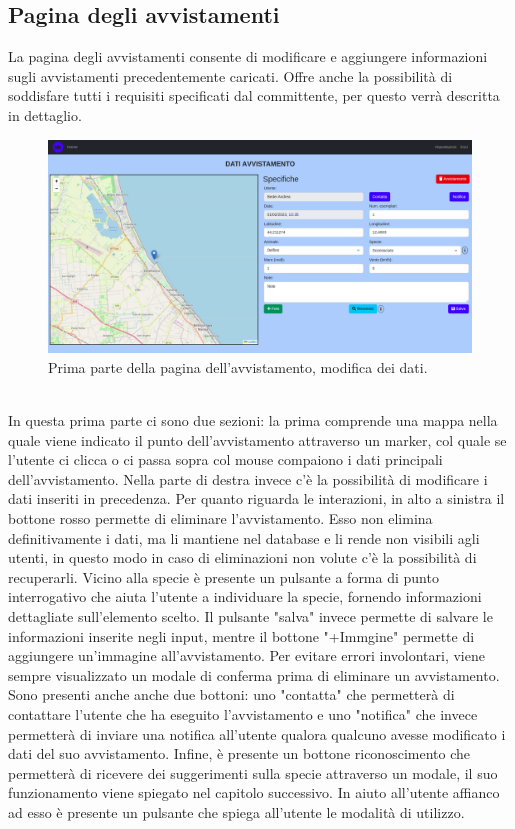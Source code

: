 \documentclass[a4paper,final,12pt]{report}
\begin{document}
\subsection{Pagina degli avvistamenti}
La pagina degli avvistamenti consente di modificare e aggiungere informazioni sugli avvistamenti precedentemente caricati. Offre anche la possibilità di soddisfare tutti i requisiti specificati dal committente, per questo verrà descritta in dettaglio.
\begin{figure}[hbtp]
\centering
\includegraphics[scale=0.22]{img_concettuale/avvistamentoPAG.png}
\caption{Prima parte della pagina dell'avvistamento, modifica dei dati.}
\end{figure}
\\In questa prima parte ci sono due sezioni: la prima comprende una mappa nella quale viene indicato il punto dell'avvistamento attraverso un marker, col quale se l'utente ci clicca o ci passa sopra col mouse compaiono i dati principali dell'avvistamento. Nella parte di destra invece c'è la possibilità di modificare i dati inseriti in precedenza.
Per quanto riguarda le interazioni, in alto a sinistra il bottone rosso permette di eliminare l'avvistamento. Esso non elimina definitivamente i dati, ma li mantiene nel database e li rende non visibili agli utenti, in questo modo in caso di eliminazioni non volute c'è la possibilità di recuperarli.
Vicino alla specie è presente un pulsante a forma di punto interrogativo che aiuta l'utente a individuare la specie, fornendo informazioni dettagliate sull'elemento scelto.  
Il pulsante "salva" invece permette di salvare le informazioni inserite negli input, mentre il bottone "+Immgine" permette di aggiungere un'immagine all'avvistamento. Per evitare errori involontari, viene sempre visualizzato un modale di conferma prima di eliminare un avvistamento. Sono presenti anche anche due bottoni: uno "contatta" che permetterà di contattare l'utente che ha eseguito l'avvistamento e uno "notifica" che invece permetterà di inviare una notifica all'utente qualora qualcuno avesse modificato i dati del suo avvistamento. Infine, è presente un bottone riconoscimento che permetterà di ricevere dei suggerimenti sulla specie attraverso un modale, il suo funzionamento viene spiegato nel capitolo successivo. In aiuto all'utente affianco ad esso è presente un pulsante che spiega all'utente le modalità di utilizzo.
\end{document}

